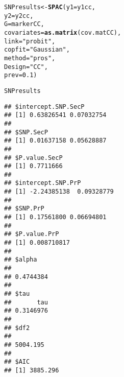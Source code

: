 \documentclass{article}\usepackage[]{graphicx}\usepackage[]{color}
\makeatletter
\newcommand{\hlnum}[1]{\textcolor[rgb]{0.686,0.059,0.569}{#1}}%
\newcommand{\hlstr}[1]{\textcolor[rgb]{0.192,0.494,0.8}{#1}}%
\newcommand{\hlstd}[1]{\textcolor[rgb]{0.345,0.345,0.345}{#1}}%
\newcommand{\hlkwb}[1]{\textcolor[rgb]{0.69,0.353,0.396}{#1}}%
\newcommand{\hlkwc}[1]{\textcolor[rgb]{0.333,0.667,0.333}{#1}}%
\newcommand{\hlkwd}[1]{\textcolor[rgb]{0.737,0.353,0.396}{\textbf{#1}}}%
\newenvironment{kframe}{%
 \def\at@end@of@kframe{}%
 \ifinner\ifhmode%
  \def\at@end@of@kframe{\end{minipage}}%
  \begin{minipage}{\columnwidth}%
 \fi\fi%
 \def\FrameCommand##1{\hskip\@totalleftmargin \hskip-\fboxsep
 \colorbox{shadecolor}{##1}\hskip-\fboxsep
     \hskip-\linewidth \hskip-\@totalleftmargin \hskip\columnwidth}%
 \MakeFramed {\advance\hsize-\width
   \@totalleftmargin\z@ \linewidth\hsize
   \@setminipage}}%
 {\par\unskip\endMakeFramed%
 \at@end@of@kframe}
\newenvironment{knitrout}{}{} %
\makeatother
\begin{document}
\begin{knitrout}
\color{fgcolor}\begin{kframe}
\begin{alltt}
\hlstd{SNPresults} \hlkwb{<-} \hlkwd{SPAC}\hlstd{(}\hlkwc{y1} \hlstd{= y1cc,}
                   \hlkwc{y2} \hlstd{= y2cc,}
                   \hlkwc{G} \hlstd{= markerCC,}
                   \hlkwc{covariates} \hlstd{=} \hlkwd{as.matrix}\hlstd{(cov.matCC),}
                   \hlkwc{link} \hlstd{=} \hlstr{"probit"}\hlstd{,}
                   \hlkwc{copfit} \hlstd{=} \hlstr{"Gaussian"}\hlstd{,}
                   \hlkwc{method} \hlstd{=} \hlstr{"pros"}\hlstd{,}
                   \hlkwc{Design} \hlstd{=} \hlstr{"CC"}\hlstd{,}
                   \hlkwc{prev} \hlstd{=} \hlnum{0.1}\hlstd{)}
\end{alltt}


{\ttfamily\noindent\itshape\color{messagecolor}{\#\# Starting association analysis of the SNP...}}\begin{alltt}
\hlstd{SNPresults}
\end{alltt}
\begin{verbatim}
## $intercept.SNP.SecP
## [1] 0.63826541 0.07032754
## 
## $SNP.SecP
## [1] 0.01637158 0.05628887
## 
## $P.value.SecP
## [1] 0.7711666
## 
## $intercept.SNP.PrP
## [1] -2.24385138  0.09328779
## 
## $SNP.PrP
## [1] 0.17561800 0.06694801
## 
## $P.value.PrP
## [1] 0.008710817
## 
## $alpha
##           
## 0.4744384 
## 
## $tau
##       tau 
## 0.3146976 
## 
## $df2
##          
## 5004.195 
## 
## $AIC
## [1] 3885.296
\end{verbatim}
\end{kframe}
\end{knitrout}
\end{document}
